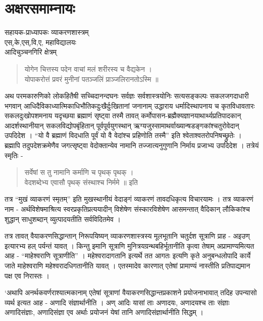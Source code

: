 {\fontsize{15}{17}\selectfont
\chapter{अक्षरसमाम्नायः}

\begin{center}
\smallskip

सहायक-प्राध्यापकः व्याकरणशास्त्रम्\\
एस्,के,एस्,वि,ए, महाविद्यालयः\\
आदिचुञ्चनगिरि क्षेत्रम् 
\addrule
\end{center}

\begin{verse}
योगेन चित्तस्य पदेन वाचां मलं शरीरस्य च वैद्यकेन ।\\
योपाकरोत्तं प्रवरं मुनीनां पतञ्जलिं प्राञ्जलिरानतोऽस्मि ॥
\end{verse}
अथ परमकारुणिको लोकहितैषी सच्चिदानन्दघनः सर्वज्ञः सर्वशास्त्रयोनिः सत्यसङ्कल्पः सकलजगदाधारी भगवान् आधिदैविकाध्यात्मिकाधिभौतिकदुःखैर्दुःखितानां जनानाम् उद्धाराय धर्मादिस्थापनाय च कृतविधावतारः सकलदुःखोपशमनाय यदृच्छया ब्रह्माणं सृष्ट्वा तस्मै तावत् कर्मोपासन-ब्रह्मैक्यज्ञानयाथार्थ्यप्रतिपादकान् आदर्शस्थानीयान् सकलविद्योपबृंहितान् पूर्वपूर्वयुगस्थान् ऋग्यजुस्सामाथर्वाख्यान्षडङ्गकांश्चतुरोवेदान् उपदिदेश । “यो वै ब्रह्माणं विदधाति पूर्वं यो वै वेदांश्च प्रहिणोति तस्मै” इति श्वेताश्वतरोपनिषच्छ्रुतेः । ब्रह्मापि तदुपदेशक्रमेणैव जगत्सृष्ट्वा वेदोक्तान्येव नामानि तज्जात्यनुगुणानि निर्माय प्रजाभ्य उपदिदेश । तत्रेयं स्मृतिः -		
\begin{verse}
सर्वेषां स तु नामानि कर्माणि च पृथक् पृथक् ।\\
वेदशब्देभ्य एवासौ पृथक् संस्थाश्च निर्ममे ॥ इति
\end{verse} 		
तत्र “मुखं व्याकरणं स्मृतम्” इति मुखस्थानीयं वेदाङ्गं व्याकरणं तावदधिकृत्य विचारयामः । तत्र व्याकरणं नाम  - अर्थविशेषमाश्रित्य स्वरप्रकृतिप्रत्ययादीन् विशेषेण संस्कारविशेषेण आसमन्तात्  वैदिकान् लौकिकांश्च शुद्धान् साधुशब्दान् व्युत्पादयतीति सर्वविदितमेव ।

तत्र तावत् वैयाकरणसिद्धान्तान् निरूपयिष्यन् व्याकरणशास्त्रस्य मूलभूतानि चतुर्दश सूत्राणि प्राह - अइउण् इत्यारभ्य हल् पर्यन्तं यावत् । किन्तु इमानि सूत्राणि मुनित्रयग्रन्थबहिर्भूतानीति कृत्वा तेषाम् अप्रामाण्यमित्यत आह - “माहेश्वराणि सूत्राणीति” । महेश्वरादागतानि इत्यर्थे तत आगतः इत्यणि कृते अनुबन्धलोपादि कार्ये जाते माहेश्वराणि महेश्वरादधिगतानीति यावत् । एतस्मादेव कारणात् एतेषां प्रामाण्यं नास्तीति प्रतिपाद्यमान पक्ष एव निरास्तः ।

‘अथापि अनर्थकवर्णराश्यात्मकानाम् एतेषां सूत्राणां वैयाकरणसिद्धान्तप्रकाशने प्रयोजनाभावात् तदिह उपन्यासो व्यर्थ इत्यत आह - अणादि संज्ञार्थानीति । अण् आदिः  यासां ताः अणादयः, अणादयश्च ताः संज्ञाः अणादिसंज्ञाः, अणादिसंज्ञा एव अर्थाः  प्रयोजनं येषां तानि अणादिसंज्ञार्थानीति सिद्धम् । 

}
